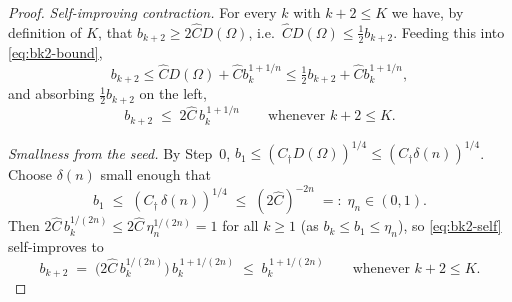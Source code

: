 \documentclass[11pt]{amsart}
\theoremstyle{definition}
\newcommand{\Om}{\Omega}
\begin{document}
\begin{proof}
\emph{Self-improving contraction.} For every $k$ with $k+2\le K$ we have,
by definition of $K$, that $b_{k+2}\ge2\widehat C D(\Om)$, i.e.\
$\widehat C D(\Om)\le\tfrac12 b_{k+2}$. Feeding this into
\eqref{eq:bk2-bound},
\[
   b_{k+2}\le\widehat C D(\Om)+\widehat C b_k^{1+1/n}
   \le\tfrac12 b_{k+2}+\widehat C b_k^{1+1/n},
\]
and absorbing $\tfrac12 b_{k+2}$ on the left,
\begin{equation}\label{eq:bk2-self}
   b_{k+2}\;\le\;2\widehat C\,b_k^{\,1+1/n}
   \qquad\text{whenever }k+2\le K .
\end{equation}

\emph{Smallness from the seed.} By Step~0, $b_1\le(C_\dagger D(\Om))^{1/4}
\le(C_\dagger\delta(n))^{1/4}$. Choose $\delta(n)$ small enough that
\begin{equation}\label{eq:seed-smallness}
   b_1\;\le\;(C_\dagger\,\delta(n))^{1/4}\;\le\;(2\widehat C)^{-2n}
   \;=:\;\eta_n\in(0,1).
\end{equation}
Then $2\widehat C\,b_k^{1/(2n)}\le2\widehat C\,\eta_n^{1/(2n)}=1$ for all
$k\ge1$ (as $b_k\le b_1\le\eta_n$), so \eqref{eq:bk2-self} self-improves
to
\begin{equation}\label{eq:bk2-power}
   b_{k+2}\;=\;\bigl(2\widehat C\,b_k^{1/(2n)}\bigr)\,b_k^{\,1+1/(2n)}
   \;\le\;b_k^{\,1+1/(2n)}\qquad\text{whenever }k+2\le K .
\end{equation}


\end{proof}
\end{document}
